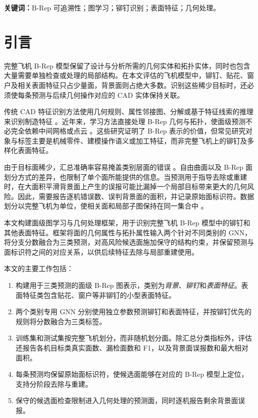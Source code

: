 \documentclass[12pt,a4paper]{ctexart}
\begin{document}
{\small\textbf{关键词：}B-Rep 可追溯性；图学习；铆钉识别；表面特征；几何处理。}

\section{引言}

完整飞机 B-Rep 模型保留了设计与分析所需的几何实体和拓扑实体，同时也包含大量需要单独检查或处理的局部结构。在本文评估的飞机模型中，铆钉、贴花、窗户及相关表面特征只占少量面，背景面则占绝大多数。识别这些稀少目标时，还必须使每条预测与后续几何操作对应的 CAD 实体保持关联。

传统 CAD 特征识别方法使用几何规则、属性邻接图、分解或基于特征线索的推理来识别制造特征 \parencite{han2000manufacturing,shah2001discourse}。近年来，学习方法直接处理 B-Rep 几何与拓扑，使面级预测不必完全依赖中间网格或点云 \parencite{jayaraman2021uvnet,lambourne2021brepnet,colligan2022hierarchical,wu2024aagnet}。这些研究证明了 B-Rep 表示的价值，但常见研究对象与标签主要是机械零件、建模操作语义或加工特征，而非完整飞机上的铆钉及多样化表面特征。

由于目标面稀少，汇总准确率容易掩盖类别层面的错误 \parencite{he2009learning}。自由曲面以及 B-Rep 面划分方式的差异，也限制了单个面所能提供的信息。当预测用于指导去除或重建时，在大面积平滑背景面上产生的误报可能比漏掉一个局部目标带来更大的几何风险。因此，需要报告逐机错误数、误判背景面的面积，并记录原始面标识符。数据划分以完整飞机为单位，使相关面和局部子图保持在同一集合中 \parencite{kapoor2023leakage}。

本文构建面级图学习与几何处理框架，用于识别完整飞机 B-Rep 模型中的铆钉和其他表面特征。框架将面的几何属性与拓扑属性输入两个针对不同类别的 GNN，将分支分数融合为三类预测，对高风险候选面施加保守的结构约束，并保留预测与面标识符之间的对应关系，以供后续特征去除与局部重建使用。

本文的主要工作包括：
\begin{enumerate}[label=(\arabic*)]
  \item 构建用于三类预测的面级 B-Rep 图表示，类别为\textit{背景}、\textit{铆钉}和\textit{表面特征}。表面特征类包含贴花、窗户等非铆钉的小型表面特征。
  \item 两个类别专用 GNN 分别使用独立参数预测铆钉和表面特征，并按铆钉优先的规则将分数融合为三类标签。
  \item 训练集和测试集按完整飞机划分，而非随机划分面。除汇总分类指标外，评估还报告各机目标类真实面数、漏检面数和 F1，以及背景面误报数和最大相对面积。
  \item 每条预测均保留原始面标识符，使候选面能够在对应的 B-Rep 模型上定位，支持分阶段去除与重建。
  \item 保守的候选面检查限制进入几何处理的预测面，同时逐机报告剩余背景面误报。
\end{enumerate}
\end{document}
